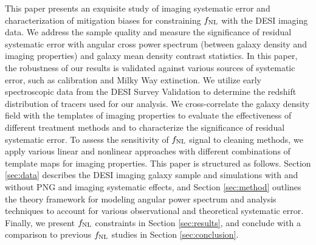 This paper presents an exquisite study of imaging systematic error and characterization of mitigation biases for constraining $f_{\rm NL}$ with the DESI imaging data. We address the sample quality and measure the significance of residual systematic error with angular cross power spectrum (between galaxy density and imaging properties) and galaxy mean density contrast statistics. In this paper, the robustness of our results is validated against various sources of systematic error, such as calibration and Milky Way extinction. We utilize early spectroscopic data from the DESI Survey Validation to determine the redshift distribution of tracers used for our analysis. We cross-correlate the galaxy density field with the templates of imaging properties to evaluate the effectiveness of different treatment methods and to characterize the significance of residual systematic error. To assess the sensitivity of $f_{\rm NL}$ signal to cleaning methods, we apply various linear and nonlinear approaches with different combinations of template maps for imaging properties. This paper is structured as follows. Section \ref{sec:data} describes the DESI imaging galaxy sample and simulations with and without PNG and imaging systematic effects, and Section \ref{sec:method} outlines the theory framework for modeling angular power spectrum and analysis techniques to account for various observational and theoretical systematic error. Finally, we present $f_{\rm NL}$ constraints in Section \ref{sec:results}, and conclude with a comparison to previous $f_{\rm NL}$ studies in Section \ref{sec:conclusion}.